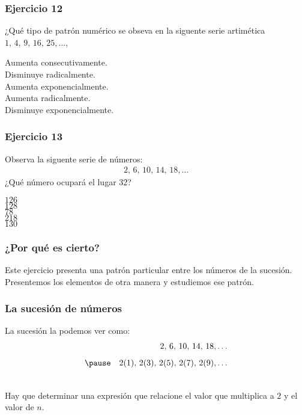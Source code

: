 \begin{frame}
\frametitle{Ejercicio 12}
¿Qué tipo de patrón numérico se obseva en la siguente serie artimética $1, \, 4, \, 9, \, 16, \, 25, \ldots$, 
\begin{choices}
\choice Aumenta consecutivamente. \\
\choice Disminuye radicalmente. \\
\choice Aumenta exponencialmente. \\
\choice Aumenta radicalmente. \\
\choice Disminuye exponencialmente.
\end{choices}
\pause
{}
\end{frame}
\begin{frame}
\frametitle{Ejercicio 13}
Observa la siguente serie de números:
\begin{align*}
2, \, 6, \, 10, \, 14, \, 18, \ldots
\end{align*}
¿Qué número ocupará el lugar 32?
\begin{choices}
\choice $126$ \\
\choice $128$ \\
\choice $78$ \\
\choice $218$ \\
\choice $130$
\end{choices}
\pause
{}
\end{frame}
\begin{frame}
\frametitle{¿Por qué es cierto?}
Este ejercicio presenta una patrón particular entre los números de la sucesión.
\\
\bigskip
\pause
Presentemos los elementos de otra manera y estudiemos ese patrón.
\end{frame}
\begin{frame}
\frametitle{La sucesión de números}
La sucesión la podemos ver como:
\begin{eqnarray*}
&{}& 2, \, 6, \, 10, \, 14, \, 18, \ldots \\[0.5em] \pause
&{}& 2(1), \, 2(3), \, 2(5), \, 2(7), \, 2(9), \ldots
\end{eqnarray*}
\pause
{}
\pause
\\
\bigskip
Hay que determinar una expresión que relacione el valor que multiplica a $2$ y el valor de $n$.
\end{frame}
